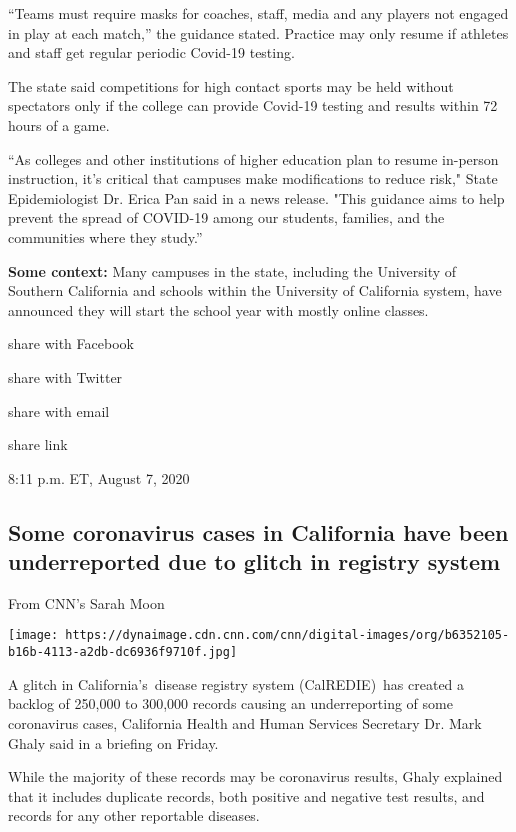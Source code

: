 ``Teams must require masks for coaches, staff, media and any players not
engaged in play at each match,'' the guidance stated. Practice may only
resume if athletes and staff get regular periodic Covid-19 testing.~

The state said competitions for high contact sports may be held without
spectators only if the college can provide Covid-19 testing and results
within 72 hours of a game.

``As colleges and other institutions of higher education plan to resume
in-person instruction, it's critical that campuses make modifications to
reduce risk," State Epidemiologist Dr. Erica Pan said in a news release.
"This guidance aims to help prevent the spread of COVID-19 among our
students, families, and the communities where they study.''~~

\textbf{Some context:} Many campuses in the state, including the
University of Southern California and schools within the University of
California system, have announced they will start the school year with
mostly online classes.

share with Facebook

share with Twitter

share with email

share link

8:11 p.m. ET, August 7, 2020

\hypertarget{some-coronavirus-cases-in-california-have-been-underreported-due-to-glitch-in-registry-system}{%
\subsection{Some coronavirus cases in California have been underreported
due to glitch in registry
system}\label{some-coronavirus-cases-in-california-have-been-underreported-due-to-glitch-in-registry-system}}

From CNN's Sarah Moon

\texttt{[image: https://dynaimage.cdn.cnn.com/cnn/digital-images/org/b6352105-b16b-4113-a2db-dc6936f9710f.jpg]}

A glitch in California's~disease registry system (CalREDIE)~has created
a backlog of 250,000 to 300,000 records causing an underreporting of
some coronavirus cases, California Health and Human Services Secretary
Dr. Mark Ghaly said in a briefing on Friday.

While the majority of these records may be coronavirus results, Ghaly
explained that it includes duplicate records, both positive and negative
test results, and records for any other reportable diseases.

